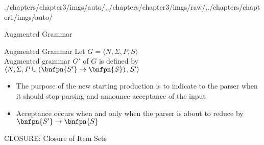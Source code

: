 \begin{graphicspathcontext}{{./chapters/chapter3/imgs/auto/},{./chapters/chapter3/imgs/raw/},{./chapters/chapter1/imgs/auto/}}
\begin{bibunit}[apalike]
\begin{frame}{Augmented Grammar}
	\begin{definitionblock}{Augmented Grammar}
		Let $G = \langle N, \Sigma, P, S\rangle$ \\
		Augmented grammar $G'$ of $G$ is defined by $\langle N, \Sigma, P \cup \left(\bnfpn{S'} \bnfopo \bnfpn{S}\right), S'\rangle$
	\end{definitionblock}
	\vspace{.25cm}
	\begin{itemize}
	\item The purpose of the new starting production is to indicate to the parser when it should stop parsing and announce acceptance of the input
	\vspace{.25cm}
	\item Acceptance occurs when and only when the parser is about to reduce by $\bnfpn{S'} \bnfopo \bnfpn{S}$
	\end{itemize}
\end{frame}

\begin{frame}{CLOSURE: Closure of Item Sets}
	\begin{myalgorithm}
		\BlankLine
	\end{myalgorithm}
\end{frame}


\end{bibunit}
\end{graphicspathcontext}
